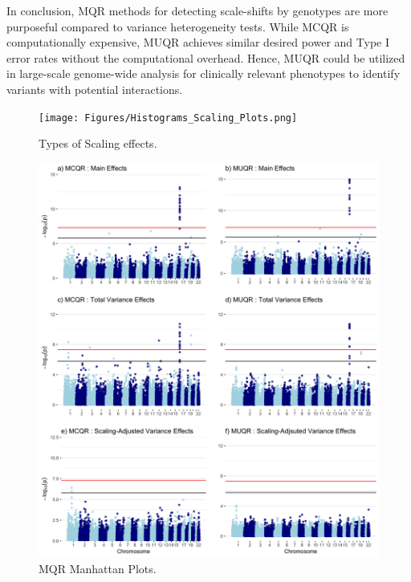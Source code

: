 \documentclass[12pt]{article}
\begin{document}
In conclusion, MQR methods for detecting scale-shifts by genotypes are more purposeful compared to variance heterogeneity tests. While MCQR is computationally expensive, MUQR achieves similar desired power and Type I error rates without the computational overhead. Hence, MUQR could be utilized in large-scale genome-wide analysis for clinically relevant phenotypes to identify variants with potential interactions. 

\newpage
\begin{figure} 
	\centering
	\texttt{[image: Figures/Histograms\_Scaling\_Plots.png]}
	\caption{Types of Scaling effects.}
	\label{fig:ScaleEffTypes}
\end{figure}

\newpage
	\begin{figure} 
	\centering
	\includegraphics[width=1 \textwidth, height=1.2\textwidth]{Figures/MQR_Manhattan_Plots.png}
	\caption{MQR Manhattan Plots.}
	\label{fig:ManhattanPlots}
\end{figure}
\end{document}

